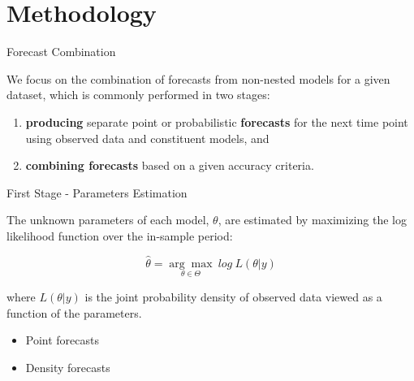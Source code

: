 
\section{Methodology}

\begin{frame}{Forecast Combination}

    We focus on the combination of forecasts from non-nested models for a given dataset, which is commonly performed in two stages:

    \vspace{5mm}

    \begin{enumerate}[<+->]
        \item \textbf{producing} separate point or probabilistic \textbf{forecasts} for the next time point using observed data and constituent models, and \newline
        \item \textbf{combining forecasts} based on a given accuracy criteria. 
    \end{enumerate}

\end{frame}



\begin{frame}{First Stage - Parameters Estimation}

    The unknown parameters of each model, $\theta$, are estimated by maximizing the log likelihood function over the in-sample period:


    \begin{equation}
    \label{eqn:theta}
    \hat\theta = \underset{\theta \in \Theta}{\arg\max} \ log \ L(\theta|y)
    \end{equation}

    where $L(\theta|y)$ is the joint probability density of observed data viewed as a function of the parameters.


    \vspace{5mm}

    \begin{itemize}
        \item Point forecasts
        \item Density forecasts
    \end{itemize}


\end{frame}



